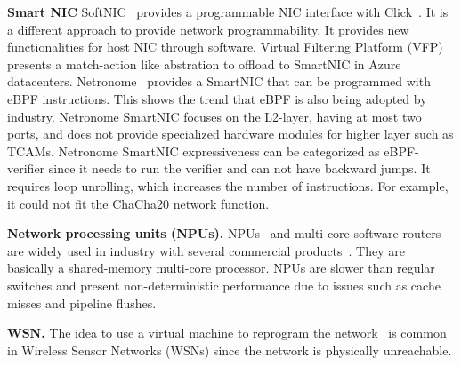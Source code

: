 \textbf{Smart NIC} 
SoftNIC~\cite{Han:EECS-2015-155} provides a programmable NIC interface with Click~\cite{Kohler:2000:CMR:354871.354874}. It is a different approach to provide network programmability. It provides new functionalities for host NIC through software.
Virtual  Filtering  Platform  (VFP)~\cite{VFP2017} presents a match-action like abstration to offload to SmartNIC in Azure datacenters.
Netronome~\cite{Netronome2018} provides a SmartNIC that can be programmed with eBPF instructions. This shows the trend that eBPF is also being adopted by industry. 
Netronome SmartNIC focuses on the L2-layer, having at most two ports, and does not provide specialized hardware modules for higher layer such as TCAMs.
Netronome SmartNIC expressiveness can be categorized as eBPF-verifier since it needs to run the verifier and can not have backward jumps. It requires loop unrolling, which increases the number of instructions. For example, it could not fit the ChaCha20 network function. 

\textbf{Network processing units (NPUs).} NPUs~\cite{Sherwood:2003:PMA:859618.859652,Keslassy:2012:PPG:2428663.2428680} 
and multi-core software routers~\cite{Dobrescu:2009:REP:1629575.1629578} are widely used in industry with several commercial products~\cite{intel, cisco, micro, mellanox}. They are basically a shared-memory multi-core processor.  NPUs are slower than regular switches and present non-deterministic performance due to issues such as cache misses and pipeline flushes. 



\textbf{WSN.} The idea to use a virtual machine to reprogram the network~\cite{Paek:2010:TAT:1777406.1777413,Levis:2002:MTV:635508.605407}
 is common in Wireless Sensor Networks (WSNs) since the network is physically unreachable.


